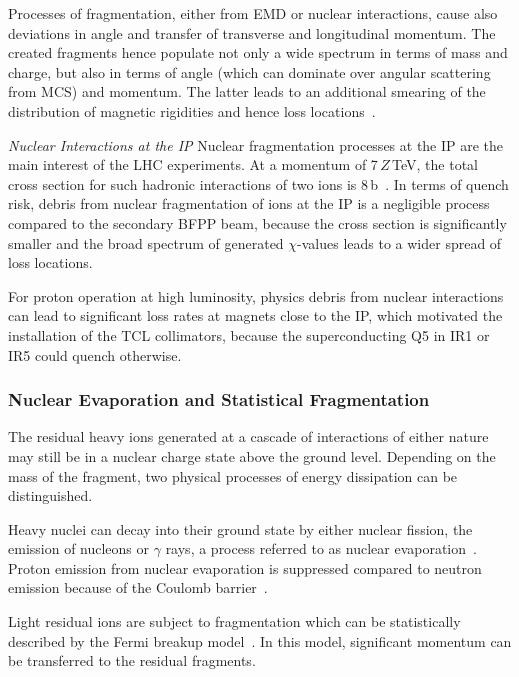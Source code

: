 Processes of fragmentation, either from EMD or nuclear interactions, cause also deviations in angle and transfer of transverse and longitudinal momentum. The created fragments hence populate not only a wide spectrum in terms of mass and charge, but also in terms of angle (which can dominate over angular scattering from MCS) and momentum. The latter leads to an additional smearing of the distribution of magnetic rigidities and hence loss locations~\cite{PhysRevSTAB17021006}.


\textit{Nuclear Interactions at the IP} \newline
Nuclear fragmentation processes at the IP are the main interest of the LHC experiments. At a momentum of 7$\,Z\,$TeV, the total cross section for such hadronic interactions of two \lead ions is 8\,b~\cite{ALICE:TechnicalProposal}. In terms of quench risk, debris from nuclear fragmentation of \lead ions at the IP is a negligible process compared to the secondary BFPP beam, because the cross section is significantly smaller and the broad spectrum of generated $\chi$-values leads to a wider spread of loss locations. 

For proton operation at high luminosity, physics debris from nuclear interactions can lead to significant loss rates at magnets close to the IP, which motivated the installation of the TCL collimators, because the superconducting Q5 in IR1 or IR5 could quench otherwise.
 

\subsubsection{Nuclear Evaporation and Statistical Fragmentation}

The residual heavy ions generated at a cascade of interactions of either nature may still be in a nuclear charge state above the ground level. Depending on the mass of the fragment, two physical processes of energy dissipation can be distinguished. 

Heavy nuclei can decay into their ground state by either nuclear fission, the emission of nucleons or $\gamma$ rays, a process referred to as nuclear evaporation~\cite{HEP2003:MOMT005}. Proton emission from nuclear evaporation is suppressed compared to neutron emission because of the Coulomb barrier~\cite{HEP2003:MOMT005}.

Light residual ions are subject to fragmentation which can be statistically described by the Fermi breakup model~\cite{fermi:breakup}. In this model, significant momentum can be transferred to the residual fragments.




